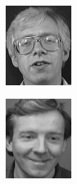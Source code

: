 \begin{frame}
\begin{columns}
\begin{overlayarea}{\textwidth}{\textheight}
\begin{minipage}[t]{0.15\textwidth}
        \includegraphics[width=\textwidth]{images/celebrity_images/s2_1.jpg}
      \end{minipage}
      \begin{minipage}[t]{0.15\textwidth}
        \includegraphics[width=\textwidth]{images/celebrity_images/s3_1.jpg}

\end{minipage}
\end{overlayarea}
\end{columns}
\end{frame}
